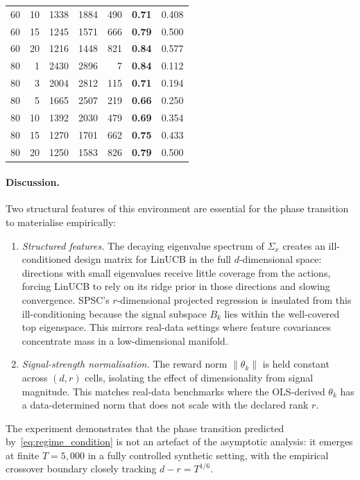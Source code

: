 \documentclass{article}
\begin{document}
{\begin{table}[!htpb]
\begin{tabular}{rr|rrr|cc}
60 & 10 & 1338 & 1884 &  490 & \textbf{0.71} & 0.408 \\
60 & 15 & 1245 & 1571 &  666 & \textbf{0.79} & 0.500 \\
60 & 20 & 1216 & 1448 &  821 & \textbf{0.84} & 0.577 \\
\midrule
80 &  1 & 2430 & 2896 &    7 & \textbf{0.84} & 0.112 \\
80 &  3 & 2004 & 2812 &  115 & \textbf{0.71} & 0.194 \\
80 &  5 & 1665 & 2507 &  219 & \textbf{0.66} & 0.250 \\
80 & 10 & 1392 & 2030 &  479 & \textbf{0.69} & 0.354 \\
80 & 15 & 1270 & 1701 &  662 & \textbf{0.75} & 0.433 \\
80 & 20 & 1250 & 1583 &  826 & \textbf{0.79} & 0.500 \\
\bottomrule
\end{tabular}
\end{table}

\paragraph{Discussion.}
Two structural features of this environment are essential for the
phase transition to materialise empirically:
\begin{enumerate}[nosep,leftmargin=1.5em]
  \item \emph{Structured features.}
  The decaying eigenvalue spectrum of $\Sigma_x$ creates an
  ill-conditioned design matrix for LinUCB in the full
  $d$-dimensional space: directions with small eigenvalues receive
  little coverage from the actions, forcing LinUCB to rely on its
  ridge prior in those directions and slowing convergence.
  SPSC's $r$-dimensional projected regression is insulated from
  this ill-conditioning because the signal subspace $B_k$ lies
  within the well-covered top eigenspace.
  This mirrors real-data settings where feature covariances
  concentrate mass in a low-dimensional manifold.

  \item \emph{Signal-strength normalisation.}
  The reward norm $\|\theta_k\|$ is held constant across
  $(d,r)$ cells, isolating the effect of dimensionality
  from signal magnitude.
  This matches real-data benchmarks where the OLS-derived
  $\theta_k$ has a data-determined norm that does not scale with
  the declared rank $r$.
\end{enumerate}
The experiment demonstrates that the phase transition predicted
by~\eqref{eq:regime_condition} is not an artefact of the
asymptotic analysis: it emerges at finite $T{=}5{,}000$ in a
fully controlled synthetic setting, with the empirical crossover
boundary closely tracking $d - r = T^{1/6}$.

}
\end{document}
